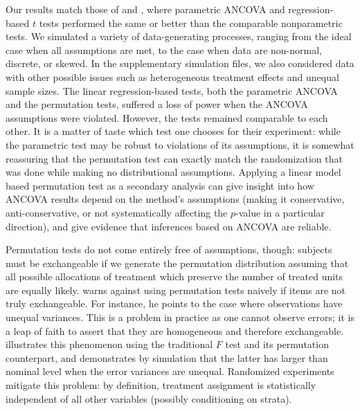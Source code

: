 \documentclass[12pt]{article}
\begin{document}
Our results match those of \citet{vickers_parametric_2005} and \citet{anderson_empirical_1999}, where parametric ANCOVA and regression-based $t$ tests performed the same or better than the comparable nonparametric tests.
We simulated a variety of data-generating processes, ranging from the ideal case when all assumptions are met, 
to the case when data are non-normal, discrete, or skewed.
In the supplementary simulation files, we also considered data with other possible issues such as heterogeneous treatment effects and unequal sample sizes.
The linear regression-based tests, both the parametric ANCOVA and the permutation tests, suffered a loss of power when the ANCOVA assumptions were violated.
However, the tests remained comparable to each other.
It is a matter of taste which test one chooses for their experiment: while the parametric test may be robust to violations of its assumptions, it is somewhat reassuring that the permutation test can exactly match the randomization that was done while making no distributional assumptions.
Applying a linear model based permutation test as a secondary analysis can give insight into how ANCOVA results depend on the method's assumptions
(making it conservative, anti-conservative, or not systematically affecting the $p$-value in a particular direction),
and give evidence that inferences based on ANCOVA are reliable.

Permutation tests do not come entirely free of assumptions, though: 
subjects must be exchangeable if we generate the permutation distribution assuming that all possible allocations of treatment which preserve the number of treated units are equally likely.
\cite{romano_behavior_1990} warns against using permutation tests naively if items are not truly exchangeable. 
For instance, he points to the case where observations have unequal variances.  
This is a problem in practice as one cannot observe errors; it is a leap of faith to assert that they are homogeneous and therefore exchangeable.
\cite{boik_fisherpitman_1987} illustrates this phenomenon using the traditional $F$ test and its permutation counterpart, 
and demonstrates by simulation that the latter has larger than nominal level when the error variances are unequal.
Randomized experiments mitigate this problem: by definition, treatment assignment is statistically independent of all other variables (possibly conditioning on strata).
\end{document}
